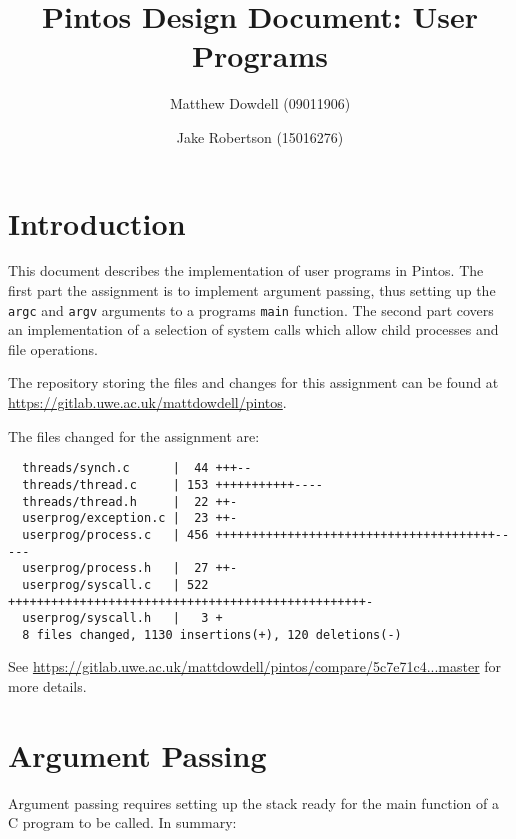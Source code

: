 \documentclass{article}
\title{Pintos Design Document: User Programs}
\author{
  Matthew Dowdell (09011906)
  \and
  Jake Robertson (15016276)
}
\date{}
\begin{document}
\null
\nointerlineskip
\vfill
\let\snewpage \newpage
\let\newpage \relax
\maketitle
\let \newpage \snewpage
\vfill
\break

\tableofcontents
\newpage

\section{Introduction}
\label{sec:introduction}

This document describes the implementation of user programs in Pintos. The first part the assignment is to implement argument passing, thus setting up the \verb!argc! and \verb!argv! arguments to a programs \verb!main! function. The second part covers an implementation of a selection of system calls which allow child processes and file operations.

The repository storing the files and changes for this assignment can be found at \url{https://gitlab.uwe.ac.uk/mattdowdell/pintos}.

The files changed for the assignment are:


\begin{verbatim}
  threads/synch.c      |  44 +++--
  threads/thread.c     | 153 +++++++++++----
  threads/thread.h     |  22 ++-
  userprog/exception.c |  23 ++-
  userprog/process.c   | 456 +++++++++++++++++++++++++++++++++++++++-----
  userprog/process.h   |  27 ++-
  userprog/syscall.c   | 522 ++++++++++++++++++++++++++++++++++++++++++++++++++-
  userprog/syscall.h   |   3 +
  8 files changed, 1130 insertions(+), 120 deletions(-)
\end{verbatim}

See \url{https://gitlab.uwe.ac.uk/mattdowdell/pintos/compare/5c7e71c4...master} for more details.

\section{Argument Passing}
\label{sec:argument-passing}

Argument passing requires setting up the stack ready for the main function of a C program to be called. In summary:
\end{document}
